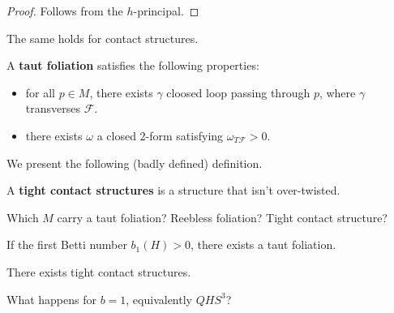 \begin{proof}
Follows from the $h$-principal.
\end{proof}

\begin{theorem}
[Eliashberg]

The same holds for contact structures.

\end{theorem}


\begin{definition}

A \textbf{taut foliation} satisfies the following properties:
\begin{itemize}
\item for all $p\in M$, there exists $\gamma$ cloosed loop passing through $p$, where $\gamma$ transverses $\mathcal{F}$.
\item there exists $\omega$ a closed 2-form satisfying $\omega_{T\mathcal{F}}>0$.
\end{itemize}

\end{definition}

We present the following (badly defined) definition.

\begin{definition}

A \textbf{tight contact structures} is a structure that isn't over-twisted.

\end{definition}

\begin{problem}

Which $M$ carry a taut foliation? Reebless foliation? Tight contact structure?

\end{problem}

\begin{theorem}

If the first Betti number $b_1(H)>0$, there exists a taut foliation.

\end{theorem}

\begin{theorem}

There exists tight contact structures.

\end{theorem}

\begin{problem}

What happens for $b=1$, equivalently $QHS^3$?

\end{problem}


